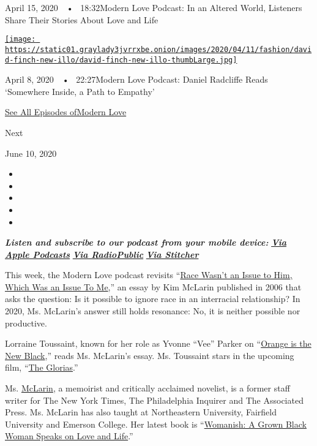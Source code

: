 April 15, 2020~~•~ 18:32Modern Love Podcast: In an Altered World,
Listeners Share Their Stories About Love and Life

\href{https://www.nytimes3xbfgragh.onion/2020/04/08/style/modern-love-podcast-daniel-radcliffe.html?action=click\&module=audio-series-bar\&region=header\&pgtype=Article}{\texttt{[image: https://static01.graylady3jvrrxbe.onion/images/2020/04/11/fashion/david-finch-new-illo/david-finch-new-illo-thumbLarge.jpg]}}

April 8, 2020~~•~ 22:27Modern Love Podcast: Daniel Radcliffe Reads
`Somewhere Inside, a Path to Empathy'

\href{https://www.nytimes3xbfgragh.onion/column/modern-love-podcast}{See
All Episodes ofModern Love}

Next

June 10, 2020

\begin{itemize}
\item
\item
\item
\item
\item
\end{itemize}

\emph{\textbf{Listen and subscribe to our podcast from your mobile
device:}}
\textbf{\href{https://itunes.apple.com/us/podcast/modern-love/id1065559535?mt=2}{\emph{Via
Apple Podcasts}}} \emph{\textbf{\textbar{}}}
\textbf{\href{https://radiopublic.com/ModernLove}{\emph{Via
RadioPublic}}} \emph{\textbf{\textbar{}}}
\textbf{\href{https://www.stitcher.com/podcast/wbur/modern-love}{\emph{Via
Stitcher}}}

This week, the Modern Love podcast revisits
``\href{https://www.nytimes3xbfgragh.onion/2006/09/03/fashion/03love.html}{Race
Wasn't an Issue to Him, Which Was an Issue To Me},'' an essay by Kim
McLarin published in 2006 that asks the question: Is it possible to
ignore race in an interracial relationship? In 2020, Ms. McLarin's
answer still holds resonance: No, it is neither possible nor productive.

Lorraine Toussaint, known for her role as Yvonne ``Vee'' Parker on
``\href{https://www.netflix.com/title/70242311}{Orange is the New
Black},'' reads Ms. McLarin's essay. Ms. Toussaint stars in the upcoming
film, ``\href{https://www.sundance.org/projects/the-glorias}{The
Glorias}.''

Ms. \href{https://www.kimmclarin.com/}{McLarin}, a memoirist and
critically acclaimed novelist, is a former staff writer for The New York
Times, The Philadelphia Inquirer and The Associated Press. Ms. McLarin
has also taught at Northeastern University, Fairfield University and
Emerson College. Her latest book is
``\href{https://www.amazon.com/Womanish-Grown-Black-Woman-Speaks/dp/1632460793}{Womanish:
A Grown Black Woman Speaks on Love and Life}.''

